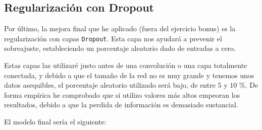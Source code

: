 \documentclass[12pt, spanish]{article}
\begin{document}
\subsection{Regularización con Dropout}

Por último, la mejora final que he aplicado (fuera del ejercicio bonus) es la regularización con capas \texttt{Dropout}\cite{dropout}. Esta capa nos ayudará a prevenir el sobreajuste, estableciendo un porcentaje aleatorio dado de entradas a cero.

Estas capas las utilizaré justo antes de una convolución o una capa totalmente conectada, y debido a que el tamaño de la red no es muy grande y tenemos unos datos asequibles, el porcentaje aleatorio utilizado será bajo, de entre $5$ y $10$ \%. De forma empírica he comprobado que si utilizo valores más altos empeoran los resultados, debido a que la perdida de información es demasiado sustancial.

El modelo final sería el siguiente:
\end{document}

